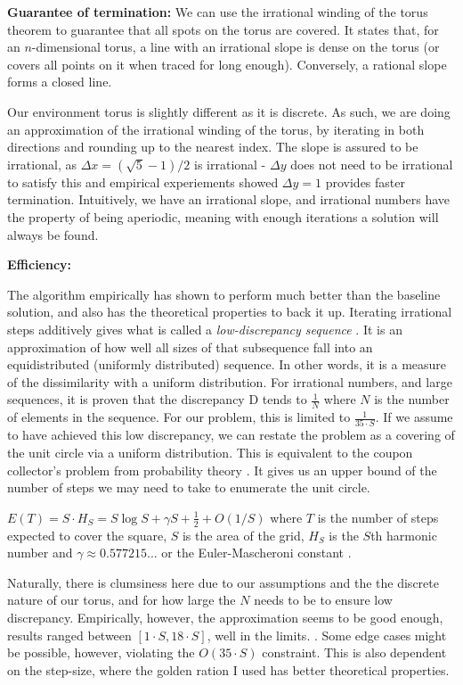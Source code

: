 \documentclass{article}
\begin{document}
\textbf{Guarantee of termination:} We can use the irrational winding of the torus theorem to guarantee that all spots on the torus are covered. It states that, for an
$n$-dimensional torus, a line with an irrational slope is dense on the torus (or covers all points on it when traced for long enough)\cite{irrational-torus}. Conversely, a rational slope forms a closed line.

Our environment torus is slightly different as it is discrete. As such, we are
doing an approximation of the irrational winding of the torus, by iterating in
both directions and rounding up to the nearest index. The slope is assured to
be irrational, as $\Delta x = (\sqrt 5 - 1)/2$ is irrational - $\Delta y$ does
not need to be irrational to satisfy this and empirical experiements showed $
    \Delta y=1$ provides faster termination. Intuitively, we have an irrational
slope, and irrational numbers have the property of being aperiodic, meaning
with enough iterations a solution will always be found.

\textbf{Efficiency:}

The algorithm empirically has shown to perform much better than the baseline
solution, and also has the theoretical properties to back it up. Iterating
irrational steps additively gives what is called a \textit{low-discrepancy
    sequence} \cite{low-discrepancy-seq}. It is an approximation of how well all
sizes of that subsequence fall into an equidistributed (uniformly distributed)
sequence. In other words, it is a measure of the dissimilarity with a uniform
distribution. For irrational numbers, and large sequences, it is proven that
the discrepancy D tends to $\frac{1}{N}$ where $N$ is the number of elements in
the sequence. For our problem, this is limited to $\frac{1}{35\cdot S}$. If we
assume to have achieved this low discrepancy, we can restate the problem as a
covering of the unit circle via a uniform distribution. This is equivalent to
the coupon collector's problem from probability theory \cite{coupon-collector}.
It gives us an upper bound of the number of steps we may need to take to
enumerate the unit circle.

${E} (T)=S\cdot H_{S}=S\log S+\gamma S+{\frac {1}{2}}+O(1/S)$ where $T$ is the number of steps expected to cover the square, $S$ is the area of the grid, $H_S$ is the $S$th harmonic number and
$\gamma \approx 0.577215...$ or the Euler-Mascheroni constant \cite{coupon-collector}.

Naturally, there is clumsiness here due to our assumptions and the the discrete
nature of our torus, and for how large the $N$ needs to be to ensure low
discrepancy. Empirically, however, the approximation seems to be good enough,
results ranged between $[1 \cdot S, 18\cdot S]$, well in the limits. . Some
edge cases might be possible, however, violating the $O(35\cdot S) $ constraint.
This is also dependent on the step-size, where the golden ration I used has
better theoretical properties.
\end{document}
